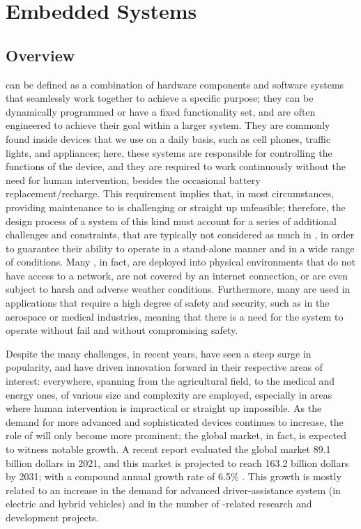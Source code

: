 \chapter{Embedded Systems}
\section{Overview}
\ess can be defined as a combination of hardware components and software systems that seamlessly work together to achieve a specific purpose; they can be dynamically programmed or have a fixed functionality set, and are often engineered to achieve their goal within a larger system. They are commonly found inside devices that we use on a daily basis, such as cell phones, traffic lights, and appliances; here, these systems are responsible for controlling the functions of the device, and they are required to work continuously without the need for human intervention, besides the occasional battery replacement/recharge.
This requirement implies that, in most circumstances, providing maintenance to \ess is challenging or straight up unfeasible; therefore, the design process of a system of this kind must account for a series of additional challenges and constraints, that are typically not considered as much in \noess, in order to guarantee their ability to operate in a stand-alone manner and in a wide range of conditions. Many \ess, in fact, are deployed into physical environments that do not have access to a network, are not covered by an internet connection, or are even subject to harsh and adverse weather conditions.
Furthermore, many \ess are used in applications that require a high degree of safety and security, such as in the aerospace or medical industries, meaning that there is a need for the system to operate without fail and without compromising safety. 

Despite the many challenges, in recent years, \ess have seen a steep surge in popularity, and have driven innovation forward in their respective areas of interest: everywhere, spanning from the agricultural field, to the medical and energy ones, \ess of various size and complexity are employed, especially in areas where human intervention is impractical or straight up impossible.
As the demand for more advanced and sophisticated devices continues to increase, the role of \ess will only become more prominent; the global \ess market, in fact, is expected to witness notable growth. A recent report evaluated the global \ess market 89.1 billion dollars in 2021, and this market is projected to reach 163.2 billion dollars by 2031; with a compound annual growth rate of  6.5\% \cite{ESSTR2022}. This growth is mostly related to  an increase in the demand for advanced driver-assistance system (in electric and hybrid vehicles) and in the number of \ess-related research and development projects. 





